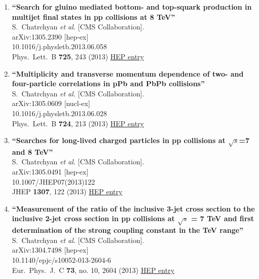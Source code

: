 \documentclass{article}
\begin{document}
\begin{enumerate}
\item%
{\bf ``Search for gluino mediated bottom- and top-squark production in multijet final states in pp collisions at 8 TeV''}
  \\{}S.~Chatrchyan {\it et al.} [CMS Collaboration].
  \\{}arXiv:1305.2390 [hep-ex]
    \\{}10.1016/j.physletb.2013.06.058
\\{}Phys.\ Lett.\ B {\bf 725}, 243 (2013) %
\href{http://inspirehep.net/record/1232968}{HEP entry}


\item%
{\bf ``Multiplicity and transverse momentum dependence of two- and four-particle correlations in pPb and PbPb collisions''}
  \\{}S.~Chatrchyan {\it et al.} [CMS Collaboration].
  \\{}arXiv:1305.0609 [nucl-ex]
    \\{}10.1016/j.physletb.2013.06.028
\\{}Phys.\ Lett.\ B {\bf 724}, 213 (2013) %
\href{http://inspirehep.net/record/1231945}{HEP entry}


\item%
{\bf ``Searches for long-lived charged particles in pp collisions at $\sqrt{s}$=7 and 8 TeV''}
  \\{}S.~Chatrchyan {\it et al.} [CMS Collaboration].
  \\{}arXiv:1305.0491 [hep-ex]
    \\{}10.1007/JHEP07(2013)122
\\{}JHEP {\bf 1307}, 122 (2013) %
\href{http://inspirehep.net/record/1231738}{HEP entry}


\item%
{\bf ``Measurement of the ratio of the inclusive 3-jet cross section to the inclusive 2-jet cross section in pp collisions at $\sqrt{s}$ = 7 TeV and first determination of the strong coupling constant in the TeV range''}
  \\{}S.~Chatrchyan {\it et al.} [CMS Collaboration].
  \\{}arXiv:1304.7498 [hep-ex]
    \\{}10.1140/epjc/s10052-013-2604-6
\\{}Eur.\ Phys.\ J.\ C {\bf 73}, no. 10, 2604 (2013) %
\href{http://inspirehep.net/record/1230937}{HEP entry}



\end{enumerate}
\end{document}
